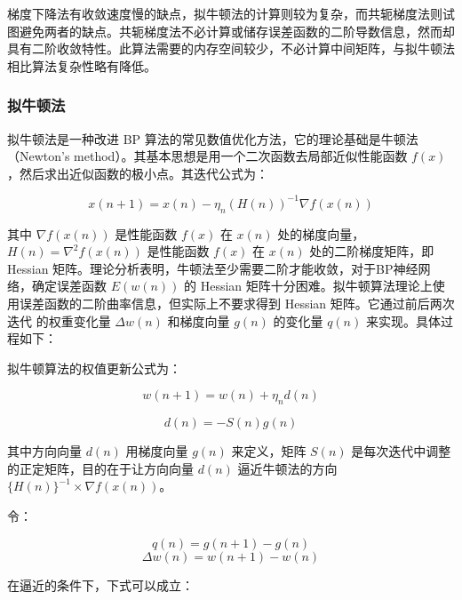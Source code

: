 \documentclass[UTF8]{ctexart}
\begin{document}
梯度下降法有收敛速度慢的缺点，拟牛顿法的计算则较为复杂，而共轭梯度法则试图避免两者的缺点。共轭梯度法不必计算或储存误差函数的二阶导数信息，然而却具有二阶收敛特性。此算法需要的内存空间较少，不必计算中间矩阵，与拟牛顿法相比算法复杂性略有降低。 


\subsubsection{拟牛顿法}

拟牛顿法是一种改进 BP 算法的常见数值优化方法，它的理论基础是牛顿法（Newton's method）。其基本思想是用一个二次函数去局部近似性能函数 $f(x)$，然后求出近似函数的极小点。其迭代公式为：

\begin{equation}
x(n+1) = x(n) - \eta_n(H(n))^{-1} \nabla f(x(n))
\end{equation}

其中 $\nabla f(x(n))$ 是性能函数 $f(x)$ 在 $x(n)$ 处的梯度向量，$H(n) = \nabla^2 f(x(n))$ 是性能函数 $f(x)$ 在 $x(n)$ 处的二阶梯度矩阵，即 Hessian 矩阵。理论分析表明，牛顿法至少需要二阶才能收敛，对于BP神经网络，确定误差函数 $E(w(n))$ 的 Hessian 矩阵十分困难。拟牛顿算法理论上使用误差函数的二阶曲率信息，但实际上不要求得到 Hessian 矩阵。它通过前后两次迭代
的权重变化量 $\Delta w(n)$ 和梯度向量 $g(n)$ 的变化量 $q(n)$ 来实现。具体过程如下： \par

拟牛顿算法的权值更新公式为： \par

\begin{equation}
w(n+1) = w(n) + \eta_n d(n) 
\end{equation}

\begin{equation}
d(n) = -S(n) g(n)
\end{equation}

其中方向向量 $d(n)$ 用梯度向量 $g(n)$ 来定义，矩阵 $S(n)$ 是每次迭代中调整的正定矩阵，目的在于让方向向量 $d(n)$ 逼近牛顿法的方向 $\{ H(n) \} ^{-1} \times \nabla f(x(n))$。 \par

令：

\begin{equation}
q(n) = g(n+1) - g(n)
\end{equation}
\begin{equation}
\Delta w(n) = w(n+1) - w(n)
\end{equation}

在逼近的条件下，下式可以成立：
\end{document}
